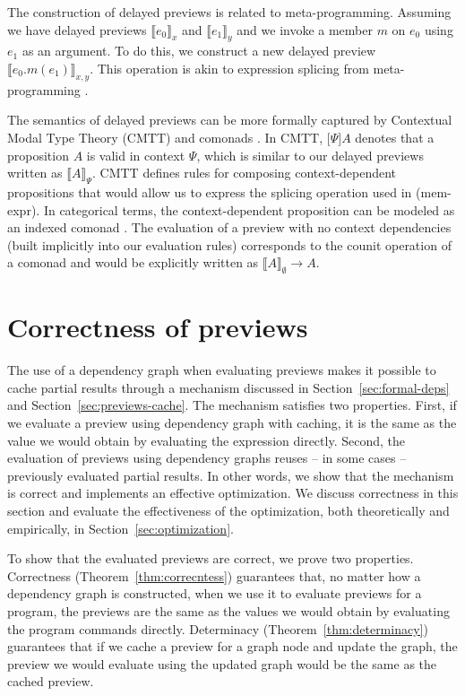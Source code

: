 \documentclass[acmsmall,anonymous,fleqn]{acmart}\settopmatter{printfolios=false,printccs=false,printacmref=false}
\theoremstyle{plain}
\theoremstyle{definition}
\newcommand{\rname}[1]{{\sffamily\small(#1)}}
\begin{document}
The construction of delayed previews is related to meta-programming. Assuming
we have delayed previews $\llbracket e_0 \rrbracket_x$ and $\llbracket e_1 \rrbracket_y$ and
we invoke a member $m$ on $e_0$ using $e_1$ as an argument. To do this, we construct a new
delayed preview $\llbracket e_0.m(e_1) \rrbracket_{x, y}$. This operation is akin to expression
splicing from meta-programming \cite{metaml,quotations}.

The semantics of delayed previews can be more formally captured by Contextual Modal Type Theory
(CMTT) \cite{cmtt} and comonads \cite{cmtt-denotation}. In CMTT, $\lbrack \Psi \rbrack A$ denotes
that a proposition $A$ is valid in context $\Psi$, which is similar to our delayed previews written
as $\llbracket A \rrbracket_\Psi$. CMTT defines rules for composing context-dependent propositions
that would allow us to express the splicing operation used in \rname{mem-expr}. In categorical
terms, the context-dependent proposition can be modeled as an indexed comonad \cite{effectrev,graded}.
The evaluation of a preview with no context dependencies (built implicitly into our evaluation rules)
corresponds to the counit operation of a comonad and would be explicitly written as
$\llbracket A \rrbracket_\emptyset \rightarrow A$.


\section{Correctness of previews}
\label{sec:correctness}

The use of a dependency graph when evaluating previews makes it possible to cache partial results
through a mechanism discussed in Section~\ref{sec:formal-deps} and Section~\ref{sec:previews-cache}.
The mechanism satisfies two properties. First, if we evaluate a preview using dependency
graph with caching, it is the same as the value we would obtain by evaluating the expression
directly. Second, the evaluation of previews using dependency graphs reuses -- in some cases --
previously evaluated partial results. In other words, we show that the mechanism is correct
and implements an effective optimization. We discuss correctness in this section and evaluate
the effectiveness of the optimization, both theoretically and empirically, in Section~\ref{sec:optimization}.

To show that the evaluated previews are correct, we prove two properties. Correctness
(Theorem~\ref{thm:correcntess}) guarantees that, no matter how a dependency graph is constructed,
when we use it to evaluate previews for a program, the previews are the same as the values we
would obtain by evaluating the program commands directly. Determinacy (Theorem~\ref{thm:determinacy})
guarantees that if we cache a preview for a graph node and update the graph, the preview we would
evaluate using the updated graph would be the same as the cached preview.
\end{document}
